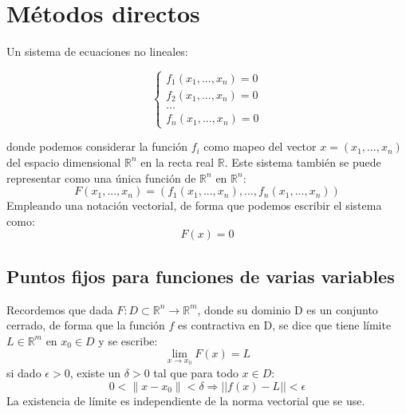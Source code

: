 	

	

\chapter{Métodos directos}


Un sistema de ecuaciones no lineales:

$$\begin{cases}
	f_1(x_1,...,x_n)  = 0 \\
	f_2(x_1,...,x_n)  = 0 \nonumber \\
	...                   \nonumber \\
	f_n(x_1,...,x_n)  = 0 \nonumber
\end{cases}$$

donde podemos considerar la función $f_i$ como mapeo del vector $x = (x_1,...,x_n)$ del espacio dimensional $\mathbb{R}^n$ en la recta real $\mathbb{R}$. Este sistema también se puede representar como una única función de $\mathbb{R}^n$ en $\mathbb{R}^n$:
\[F(x_1,...,x_n) = (f_1(x_1,...,x_n),...,f_n(x_1,...,x_n))\]
Empleando una notación vectorial, de forma que podemos escribir el sistema como:
\[F(x) = 0\]

\section{Puntos fijos para funciones de varias variables}


	Recordemos que dada $F: D \subset \mathbb{R}^n \longrightarrow \mathbb{R}^m$, donde su dominio D es un conjunto cerrado, de forma que la función $f$ es contractiva en D, se dice que tiene límite $L \in  \mathbb{R}^m$ en $x_0 \in D$ y se escribe:
	\[\lim_{x \rightarrow x_0} F(x) = L\]
	si dado $\epsilon > 0$, existe un $ \delta > 0$ tal que para todo
	$ x \in D$:
	 $$0 < \|x-x_0\| < \delta \Rightarrow ||f(x) - L|| < \epsilon $$
	La existencia de límite es independiente de la norma vectorial que se use. 

